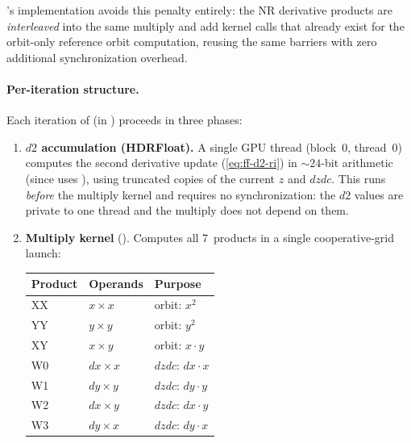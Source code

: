 \FractalShark{}'s implementation avoids this penalty entirely: the
NR derivative products are \emph{interleaved} into the same multiply and
add kernel calls that already exist for the orbit-only reference orbit
computation, reusing the same barriers with zero additional
synchronization overhead.

\paragraph{Per-iteration structure.}
Each iteration of 
(in )
proceeds in three phases:

\begin{enumerate}
\item \textbf{$d2$ accumulation (HDRFloat).}
  A single GPU thread (block~0, thread~0) computes the second derivative
  update (\cref{eq:ff-d2-ri}) in ${\sim}24$-bit 
  arithmetic (since  uses ),
  using truncated copies of the current $z$ and
  $\mathit{dzdc}$.  This runs \emph{before} the multiply kernel and
  requires no synchronization: the $d2$ values are private to one thread
  and the multiply does not depend on them.

\item \textbf{Multiply kernel} ().
  Computes all 7~products in a single cooperative-grid launch:
  \begin{center}
  \small
  \begin{tabular}{lll}
  \hline
  \textbf{Product} & \textbf{Operands} & \textbf{Purpose} \\
  \hline
  XX & $x \times x$ & orbit: $x^2$ \\
  YY & $y \times y$ & orbit: $y^2$ \\
  XY & $x \times y$ & orbit: $x \cdot y$ \\
  W0 & $dx \times x$ & $\mathit{dzdc}$: $dx \cdot x$ \\
  W1 & $dy \times y$ & $\mathit{dzdc}$: $dy \cdot y$ \\
  W2 & $dx \times y$ & $\mathit{dzdc}$: $dx \cdot y$ \\
  W3 & $dy \times x$ & $\mathit{dzdc}$: $dy \cdot x$ \\
  \hline
  \end{tabular}
  \end{center}


\end{enumerate}
